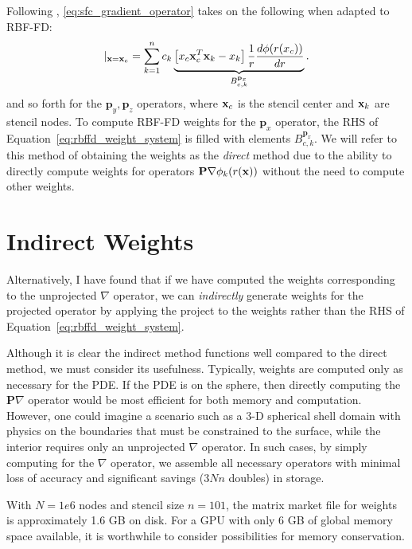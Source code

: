 Following \cite{FlyerLehto11}, \ref{eq:sfc_gradient_operator} takes on the following when adapted to RBF-FD:  
\begin{equation}
[ \mathbf{p}_{x} \cdot \nabla{f(\vx)}] |_{\vx = \vx_{c}} = \sum_{k=1}^{n} c_{k} \underbrace{\left[ x_{c} \vx_{c}^{T} \vx_{k} - x_{k} \right] \frac{1}{r} \d{\phi(r(x_{c}))}{r}}_{B_{c,k}^{\mathbf{p}_{x}}}. 
\label{eq:xsfc_operator_flyer_et_al}
\end{equation}
and so forth for the $\mathbf{p}_{y}, \mathbf{p}_{z}$ operators, where $\mathbf{x}_{c}$ is the stencil center and $\mathbf{x}_{k}$ are stencil nodes. To compute RBF-FD weights for the $\mathbf{p}_{x}$ operator, the RHS of Equation~\ref{eq:rbffd_weight_system} is filled with elements $B_{c,k}^{\mathbf{p}_{x}}$. We will refer to this method of obtaining the weights as the \emph{direct} method due to the ability to directly compute weights for operators $\mathbf{P} \nabla \phi_{k}(r(\mathbf{x}))$ without the need to compute other weights.

\section{Indirect Weights} 

Alternatively, I have found that if we have computed the weights corresponding to the unprojected $\nabla$ operator, we can \emph{indirectly} generate weights for the projected operator by applying the project to the weights rather than the RHS of Equation~\ref{eq:rbffd_weight_system}. 



Although it is clear the indirect method functions well compared to the direct method, we must consider its usefulness. Typically, weights are computed only as necessary for the PDE. If the PDE is on the sphere, then directly computing the $\mathbf{P}\nabla$ operator would be most efficient for both memory and computation. However, one could imagine a scenario such as a 3-D spherical shell domain with physics on the boundaries that must be constrained to the surface, while the interior requires only an unprojected $\nabla$ operator. In such cases, by simply computing for the $\nabla$ operator, we assemble all necessary operators with minimal loss of accuracy and significant savings ($3Nn$ doubles) in storage. 


With $N=1e6$ nodes and stencil size $n=101$, the matrix market file for weights is approximately 1.6 GB on disk. For a GPU with only 6 GB of global memory space available, it is worthwhile to consider possibilities for memory conservation. 


